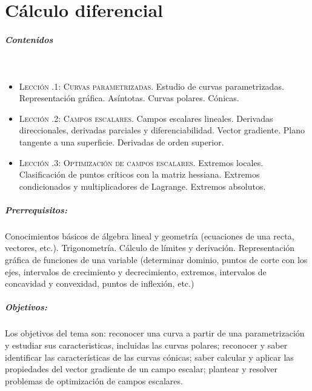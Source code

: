 \chapter{Cálculo diferencial}

\pagestyle{temas}
\thispagestyle{primera}

\paragraph{Contenidos}\ 

\vspace{-1em}
\begin{itemize}
\item
{\scshape Lección \thechapter.1: Curvas parametrizadas.}
Estudio de curvas parametrizadas.
Representación gráfica.
Asíntotas.
Curvas polares.
Cónicas.

\item
{\scshape Lección \thechapter.2: Campos escalares.}
Campos escalares lineales.
Derivadas direccionales, derivadas parciales y diferenciabilidad.
Vector gradiente.
Plano tangente a una superficie.
Derivadas de orden superior.

\item
{\scshape Lección \thechapter.3: Optimización de campos escalares.}
Extremos locales.
Clasificación de puntos críticos con la matriz hessiana.
Extremos condicionados y multiplicadores de Lagrange.
Extremos absolutos.
\end{itemize}

\paragraph{Prerrequisitos:}
Conocimientos básicos de álgebra lineal y geometría 
(ecuaciones de una recta, vectores, etc.). Trigonometría. Cálculo de límites y derivación. Representación gráfica de funciones de una variable (determinar dominio, puntos de corte con los ejes, intervalos de crecimiento y decrecimiento, extremos, intervalos de concavidad y convexidad, puntos de inflexión, etc.)


\paragraph{Objetivos:}
Los objetivos del tema son: reconocer una curva a partir de una parametrización y estudiar sus caracteristicas, incluidas las curvas polares;
reconocer y saber identificar las características de las curvas cónicas;
saber calcular y aplicar las propiedades del vector gradiente de un campo escalar;
plantear y resolver problemas de optimización de campos escalares.

